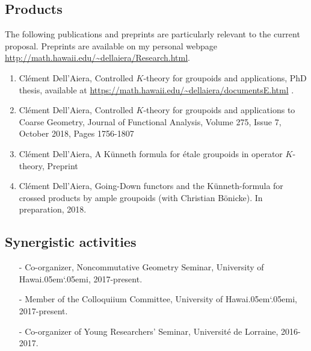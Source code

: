 \documentclass[11pt]{article}
\newcommand{\Hawaii}{Hawai\kern.05em`\kern.05em\relax i}
\begin{document}
\vspace{.5cm} 

\subsection*{Products}

The following publications and preprints are particularly relevant to the current proposal. Preprints are available on my personal webpage \url{http://math.hawaii.edu/~dellaiera/Research.html}.

\begin{enumerate}
\item Cl\'ement Dell'Aiera, Controlled $K$-theory for groupoids and applications, PhD thesis, available at \url{https://math.hawaii.edu/~dellaiera/documentsE.html} .
\item Cl\'ement Dell'Aiera, Controlled $K$-theory for groupoids and applications to Coarse Geometry, Journal of Functional Analysis, Volume 275, Issue 7, October 2018, Pages 1756-1807
\item Cl\'ement Dell'Aiera, A K\"{u}nneth formula for \'etale groupoids in operator $K$-theory, Preprint 
\item Cl\'ement Dell'Aiera, Going-Down functors and the K\"unneth-formula for crossed products by ample groupoids (with Christian B\"onicke). In preparation, 2018. 
\end{enumerate}

\vspace{.5cm}

\subsection*{Synergistic activities}

\begin{itemize}
\item[-] Co-organizer, Noncommutative Geometry Seminar, University of \Hawaii, 2017-present.
\item[-] Member of the Colloquiium Committee, University of \Hawaii, 2017-present.
\item[-] Co-organizer of Young Researchers' Seminar, Universit\'e de Lorraine, 2016-2017.

\end{itemize}

\vspace{.2cm}

\end{document}
